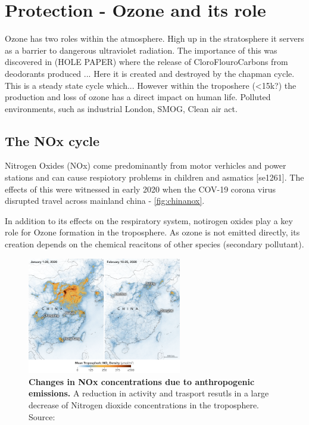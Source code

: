 %
\section{Protection - Ozone and its role}\label{sec:ozonerole}
Ozone has two roles within the atmosphere. High up in the stratosphere it servers as a barrier to dangerous ultraviolet radiation. The importance of this was discovered in (HOLE PAPER) where the release of CloroFlouroCarbons from deodorants produced ...
Here it is created and destroyed by the chapman cycle. This is a steady state cycle which...
However within the troposhere (<15k?) the production and loss of ozone has a direct impact on human life. Polluted environments, such as industrial London,
SMOG, Clean air act.
%
%
\subsection{The NOx cycle}\label{sec:noxcycle}
Nitrogen Oxides (NOx) come predominantly from motor verhicles and power stations and can cause respiotory problems in children and asmatics [se1261]. The effects of this were witnessed in early 2020 when the COV-19 corona virus disrupted travel across mainland china - \autoref{fig:chinanox}.

In addition to its effects on the respiratory system, notirogen oxides play a key role for Ozone formation in the troposphere. As ozone is not emitted directly, its creation depends on the chemical reacitons of other species (secondary pollutant).



\begin{figure}[H]
    \centering
    \includegraphics[width=0.6\textwidth]{china_trop_2020056.png}
    \caption{\textbf{Changes in NOx concentrations due to anthropogenic emissions.} A reduction in activity and trasport resutls in a large decrease of Nitrogen dioxide concentrations in the troposphere. Source: \citep{chinanox}}
    \label{fig:chinanox}
\end{figure}

